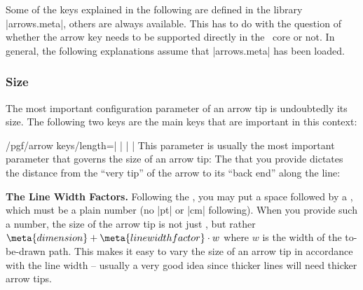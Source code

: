 Some of the keys explained in the following are defined in the library
|arrows.meta|, others are always available. This has to do with the question of
whether the arrow key needs to be supported directly in the \pgfname\ core or
not. In general, the following explanations assume that |arrows.meta| has been
loaded.


\subsubsection{Size}

The most important configuration parameter of an arrow tip is undoubtedly its
size. The following two keys are the main keys that are important in this
context:

\begin{key}{/pgf/arrow keys/length=| |%
        | |}
        \label{length-arrow-key}%
    This parameter is usually the most important parameter that governs the
    size of an arrow tip: The  that you provide dictates the
    distance from the ``very tip'' of the arrow to its ``back end'' along the
    line:
\begin{codeexample}[]
\end{codeexample}
\begin{codeexample}[]
\end{codeexample}
\begin{codeexample}[]
\end{codeexample}

    \medskip
    \noindent \textbf{The Line Width Factors.}
    Following the , you may put a space followed by a
    , which must be a plain number (no |pt| or |cm|
    following). When you provide such a number, the size of the arrow tip is
    not just , but rather $\meta{dimension} + \meta{line width
    factor}\cdot w$ where $w$ is the width of the to-be-drawn path. This makes
    it easy to vary the size of an arrow tip in accordance with the line width
    -- usually a very good idea since thicker lines will need thicker arrow
    tips.


\end{key}
